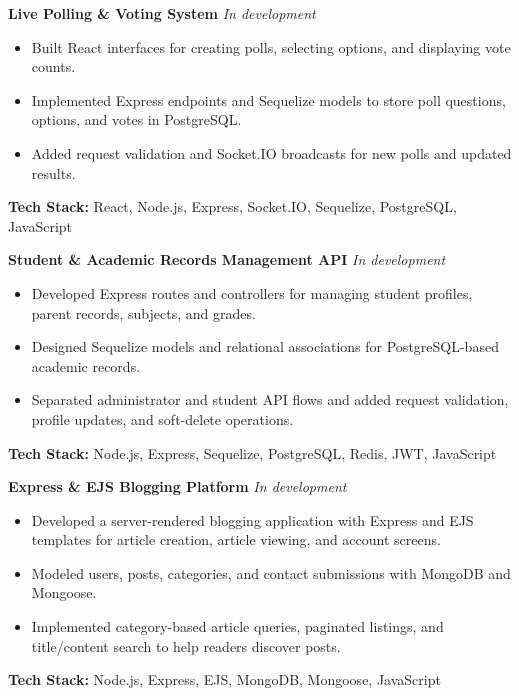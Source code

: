 \noindent\textbf{Live Polling \& Voting System} \hfill\textit{In development}
\begin{itemize}[leftmargin=*,nosep,topsep=3pt]
  \item Built React interfaces for creating polls, selecting options, and displaying vote counts.
  \item Implemented Express endpoints and Sequelize models to store poll questions, options, and votes in PostgreSQL.
  \item Added request validation and Socket.IO broadcasts for new polls and updated results.
\end{itemize}
\noindent\textbf{Tech Stack:} React, Node.js, Express, Socket.IO, Sequelize, PostgreSQL, JavaScript\par\medskip

\noindent\textbf{Student \& Academic Records Management API} \hfill\textit{In development}
\begin{itemize}[leftmargin=*,nosep,topsep=3pt]
  \item Developed Express routes and controllers for managing student profiles, parent records, subjects, and grades.
  \item Designed Sequelize models and relational associations for PostgreSQL-based academic records.
  \item Separated administrator and student API flows and added request validation, profile updates, and soft-delete operations.
\end{itemize}
\noindent\textbf{Tech Stack:} Node.js, Express, Sequelize, PostgreSQL, Redis, JWT, JavaScript\par\medskip

\noindent\textbf{Express \& EJS Blogging Platform} \hfill\textit{In development}
\begin{itemize}[leftmargin=*,nosep,topsep=3pt]
  \item Developed a server-rendered blogging application with Express and EJS templates for article creation, article viewing, and account screens.
  \item Modeled users, posts, categories, and contact submissions with MongoDB and Mongoose.
  \item Implemented category-based article queries, paginated listings, and title/content search to help readers discover posts.
\end{itemize}
\noindent\textbf{Tech Stack:} Node.js, Express, EJS, MongoDB, Mongoose, JavaScript\par\medskip

